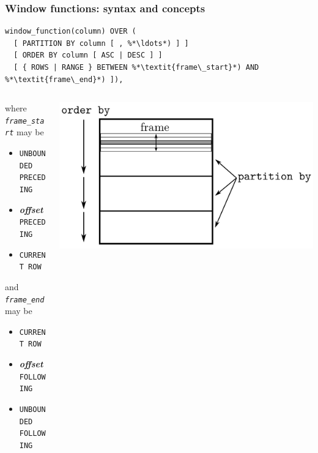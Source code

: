 \documentclass[compress, dvipsnames, unicode]{beamer}
\begin{document}
\begin{frame}[fragile]
\frametitle{Window functions: syntax and concepts}
\begin{lstlisting}
window_function(column) OVER (
  [ PARTITION BY column [ , %*\ldots*) ] ]
  [ ORDER BY column [ ASC | DESC ] ]
  [ { ROWS | RANGE } BETWEEN %*\textit{frame\_start}*) AND %*\textit{frame\_end}*) ]),
\end{lstlisting}

\begin{columns}
	\begin{column}{0.5\textwidth}
		\noindent where \texttt{\textit{frame\_start}} may be
		\begin{itemize}
			\item \texttt{UNBOUNDED PRECEDING}
			\item \textbf{\textit{offset}} \texttt{PRECEDING}
			\item \texttt{CURRENT ROW}
		\end{itemize}
		
		\noindent and \texttt{\textit{frame\_end}} may be
		\begin{itemize}
			\item \texttt{CURRENT ROW}
			\item \textbf{\textit{offset}} \texttt{FOLLOWING}
			\item \texttt{UNBOUNDED FOLLOWING}
		\end{itemize}
	\end{column}
	\begin{column}{0.5\textwidth}
		\includegraphics[width=1.0\textwidth]{wf_concepts}
	\end{column}
\end{columns}
\let\thefootnote\relax{}
\end{frame}
\end{document}
